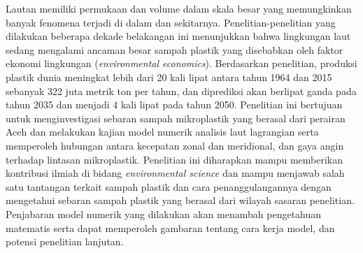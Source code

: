 \begin{spacing}{1.5}
	\pagestyle{empty}
	\begin{center}
		\vskip 1cm
		\justifying
		Lautan memiliki permukaan dan volume dalam skala besar yang memungkinkan banyak fenomena terjadi di dalam dan sekitarnya. Penelitian-penelitian yang dilakukan beberapa dekade belakangan ini menunjukkan bahwa lingkungan laut sedang mengalami ancaman besar sampah plastik yang disebabkan oleh faktor ekonomi lingkungan (\textit{environmental economics}). Berdasarkan penelitian, produksi plastik dunia meningkat lebih dari 20 kali lipat antara tahun 1964 dan 2015 sebanyak 322 juta metrik ton per tahun, dan diprediksi akan berlipat ganda pada tahun 2035 dan menjadi 4 kali lipat pada tahun 2050. Penelitian ini bertujuan untuk menginvestigasi sebaran sampah mikroplastik yang berasal dari perairan Aceh dan melakukan kajian model numerik analisis laut lagrangian serta memperoleh hubungan antara kecepatan zonal dan meridional, dan gaya angin terhadap lintasan mikroplastik. Penelitian ini diharapkan mampu memberikan kontribusi ilmiah di bidang \textit{environmental science} dan mampu menjawab salah satu tantangan terkait sampah plastik dan cara penanggulangannya dengan mengetahui sebaran sampah plastik yang berasal dari wilayah sasaran penelitian. Penjabaran model numerik yang dilakukan akan menambah pengetahuan matematis serta dapat memperoleh gambaran tentang cara kerja model, dan potensi penelitian lanjutan.
	\end{center}
\end{spacing}
\pagestyle{empty}